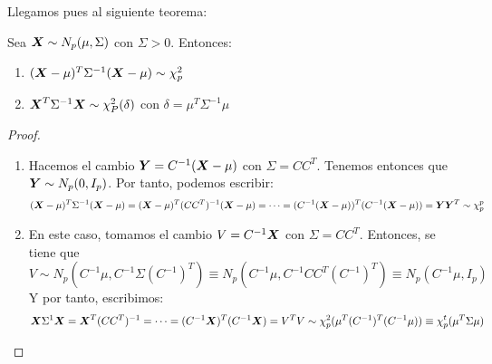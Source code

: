 Llegamos pues al siguiente teorema:
\begin{nth}
  Sea $\boldsymbol{X} \sim N_p (\mu,\Sigma)$ con $\Sigma > 0$. Entonces:
  \begin{enumerate}
  \item $(\boldsymbol{X} - \mu)^T \Sigma^{-1} (\boldsymbol{X}-\mu) \sim \chi^2_p$
    \item $\boldsymbol{X}^T \Sigma^{-1}\boldsymbol{X} \sim \chi^2_P (\delta)$ con $\delta = \mu^T \Sigma^{-1} \mu$
  \end{enumerate}
\end{nth}
\begin{proof}
  \begin{enumerate}
  \item Hacemos el cambio $\boldsymbol{Y} = C^{-1}(\boldsymbol{X} - \mu)$ con $\Sigma = CC^T$. Tenemos entonces que $\boldsymbol{Y} \sim N_p(0,I_p)$. Por tanto, podemos escribir:
    \[
    (\boldsymbol{X} - \mu)^T \Sigma^{-1} (\boldsymbol{X} - \mu ) = (\boldsymbol{X} - \mu)^T(CC^T)^{-1} (\boldsymbol{X} - \mu) = \dots = (C^{-1}(\boldsymbol{X} - \mu))^T(C^{-1}(\boldsymbol{X} - \mu)) = \boldsymbol{Y} \boldsymbol{Y}^T \sim \chi^p_p
    \]

  \item En este caso, tomamos el cambio $V  =C^{-1}\boldsymbol{X}$ con $\Sigma = CC^T$. Entonces, se tiene que
    \[
    V \sim N_p(C^{-1}\mu, C^{-1}\Sigma(C^{-1})^T) \equiv N_p(C^{-1}\mu, C^{-1}CC^T(C^{-1})^T) \equiv N_p(C^{-1}\mu, I_p)
    \]
    Y por tanto, escribimos:
    \[
    \boldsymbol{X} \Sigma^{1} \boldsymbol{X} = \boldsymbol{X}^T (CC^T)^{-1} = \dots = (C^{-1} \boldsymbol{X})^T(C^{-1}\boldsymbol{X}) = V^T V \sim \chi_p^2(\mu^T(C^{-1})^T(C^{-1}\mu)) \equiv \chi_p^t(\mu^T \Sigma \mu)
    \]

  \end{enumerate}
\end{proof}

